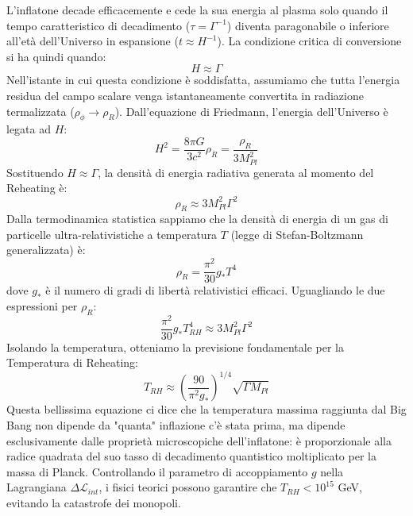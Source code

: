 \documentclass[11pt,a4paper]{report}
\begin{document}
L'inflatone decade efficacemente e cede la sua energia al plasma solo quando il tempo caratteristico di decadimento ($\tau = \Gamma^{-1}$) diventa paragonabile o inferiore all'età dell'Universo in espansione ($t \approx H^{-1}$). La condizione critica di conversione si ha quindi quando:
\begin{equation}
H \approx \Gamma
\end{equation}
Nell'istante in cui questa condizione è soddisfatta, assumiamo che tutta l'energia residua del campo scalare venga istantaneamente convertita in radiazione termalizzata ($\rho_\phi \to \rho_R$). 
Dall'equazione di Friedmann, l'energia dell'Universo è legata ad $H$:
\begin{equation}
H^2 = \frac{8\pi G}{3c^2}\rho_R = \frac{\rho_R}{3M_{Pl}^2}
\end{equation}
Sostituendo $H \approx \Gamma$, la densità di energia radiativa generata al momento del Reheating è:
\begin{equation}
\rho_R \approx 3 M_{Pl}^2 \Gamma^2
\end{equation}
Dalla termodinamica statistica sappiamo che la densità di energia di un gas di particelle ultra-relativistiche a temperatura $T$ (legge di Stefan-Boltzmann generalizzata) è:
\begin{equation}
\rho_R = \frac{\pi^2}{30} g_* T^4
\end{equation}
dove $g_*$ è il numero di gradi di libertà relativistici efficaci.
Uguagliando le due espressioni per $\rho_R$:
\begin{equation}
\frac{\pi^2}{30} g_* T_{RH}^4 \approx 3 M_{Pl}^2 \Gamma^2
\end{equation}
Isolando la temperatura, otteniamo la previsione fondamentale per la Temperatura di Reheating:
\begin{equation}
T_{RH} \approx \left( \frac{90}{\pi^2 g_*} \right)^{1/4} \sqrt{\Gamma M_{Pl}}
\end{equation}
Questa bellissima equazione ci dice che la temperatura massima raggiunta dal Big Bang non dipende da "quanta" inflazione c'è stata prima, ma dipende esclusivamente dalle proprietà microscopiche dell'inflatone: è proporzionale alla radice quadrata del suo tasso di decadimento quantistico moltiplicato per la massa di Planck. Controllando il parametro di accoppiamento $g$ nella Lagrangiana $\Delta \mathcal{L}_{int}$, i fisici teorici possono garantire che $T_{RH} < 10^{15}$ GeV, evitando la catastrofe dei monopoli.

\end{document}
